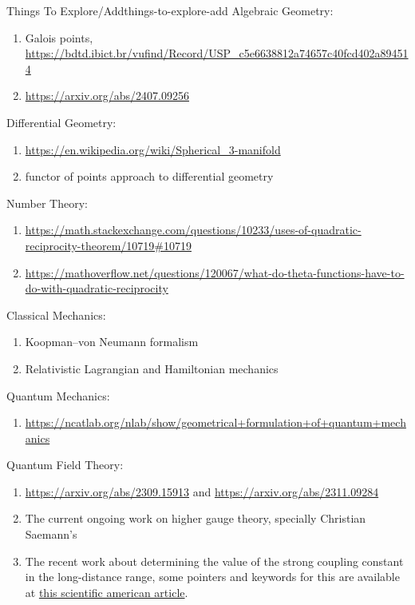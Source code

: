 \begin{remark}{Things To Explore/Add}{things-to-explore-add}
    Algebraic Geometry:
    \begin{enumerate}
        \item Galois points, \url{https://bdtd.ibict.br/vufind/Record/USP_c5e6638812a74657c40fcd402a894514}
        \item \url{https://arxiv.org/abs/2407.09256}
    \end{enumerate}
    Differential Geometry:
    \begin{enumerate}
        \item \url{https://en.wikipedia.org/wiki/Spherical\_3-manifold}
        \item functor of points approach to differential geometry
    \end{enumerate}
    Number Theory:
    \begin{enumerate}
        \item \url{https://math.stackexchange.com/questions/10233/uses-of-quadratic-reciprocity-theorem/10719#10719}
        \item \url{https://mathoverflow.net/questions/120067/what-do-theta-functions-have-to-do-with-quadratic-reciprocity}
    \end{enumerate}
    Classical Mechanics:
    \begin{enumerate}
        \item Koopman--von Neumann formalism
        \item Relativistic Lagrangian and Hamiltonian mechanics
    \end{enumerate}
    Quantum Mechanics:
    \begin{enumerate}
        \item \url{https://ncatlab.org/nlab/show/geometrical+formulation+of+quantum+mechanics}
    \end{enumerate}
    Quantum Field Theory:
    \begin{enumerate}
        \item \url{https://arxiv.org/abs/2309.15913} and \url{https://arxiv.org/abs/2311.09284}
        \item The current ongoing work on higher gauge theory, specially Christian Saemann's
        \item The recent work about determining the value of the strong coupling constant in the long-distance range, some pointers and keywords for this are available at \href{https://www.scientificamerican.com/article/physicists-finally-know-how-the-strong-force-gets-its-strength/}{this scientific american article}.
    \end{enumerate}

\end{remark}
